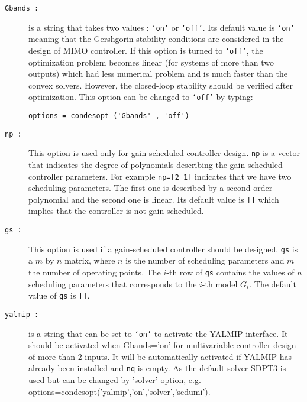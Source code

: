 \documentclass [12pt , a4paper] {report}
\begin{document}
\begin{description}
\item[\texttt{Gbands :}] is a string that takes two values : {\tt `on'} or {\tt `off'}. Its default value is {\tt `on'} meaning that the Gershgorin stability conditions are considered in the design of MIMO controller. If this option is turned to {\tt `off'}, the optimization problem becomes linear (for systems of more than two outputs) which had less numerical problem and is much faster than the convex solvers. However, the closed-loop stability should be verified after optimization. This option can be changed to {\tt `off'} by typing:
\begin{lstlisting}
options = condesopt ('Gbands' , 'off')
\end{lstlisting}


\item[\texttt{np :}] This option is used only for gain scheduled controller design. {\tt np} is a vector that indicates the degree of 
polynomials describing the gain-scheduled controller parameters. For example {\tt np=[2 1]} indicates that we have two scheduling
parameters. The first one is described by a second-order polynomial and the second one is linear. Its default value is \texttt{[]} which implies that the controller is not gain-scheduled.

\item[\texttt{gs :}] This option is used if a gain-scheduled controller should be designed. \texttt{gs} is a $m$ by $n$ matrix, where $n$ is the number 
of scheduling parameters and $m$ the number of operating points. The $i$-th row of {\tt gs} contains the values of $n$ scheduling
parameters that corresponds to the $i$-th model $G_i$. The default value of \texttt{gs} is \texttt{[]}.

 \item[{\tt yalmip :}]   is a string that can be set to {\tt `on'} to activate the YALMIP interface. It should be activated when  Gbands='on' for multivariable controller design of more than 2 inputs. It will be automatically activated if YALMIP has already been installed and {\tt nq} is empty. As  the default solver SDPT3 is used  but can be changed by 'solver' option, e.g. options=condesopt('yalmip','on','solver','sedumi').


\end{description}
\end{document}
